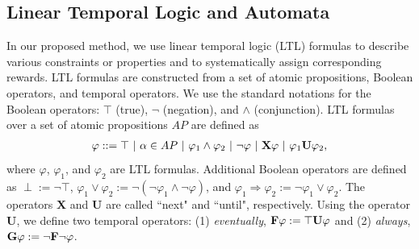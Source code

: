 \documentclass[letterpaper, 10 pt, conference]{ieeeconf}  %
\begin{document}
\subsection{Linear Temporal Logic and Automata}

In our proposed method, we use linear temporal logic (LTL) formulas to describe various constraints or properties and to systematically assign corresponding rewards.
LTL formulas are constructed from a set of atomic propositions, Boolean operators, and temporal operators. We use the standard notations for the Boolean operators: $\top$ (true), $\neg$ (negation), and $\land$ (conjunction).
LTL formulas over a set of atomic propositions $AP$ are defined as
\begin{align*}
  \varphi ::=\top\ |\ \alpha \in AP\ |\ \varphi_1 \land \varphi_2\ |\ \neg \varphi\ |\ \text{{\bf X}} \varphi\ |\ \varphi_1 \text{{\bf U}} \varphi_2,
\end{align*}
where $\varphi$, $\varphi_1$, and $\varphi_2$ are LTL formulas.
Additional Boolean operators are defined as $\perp := \neg \top $, $\varphi_1 \lor \varphi_2 := \neg(\neg \varphi_1 \land \neg \varphi)$, and $\varphi_1 \Rightarrow \varphi_2 := \neg \varphi_1 \lor \varphi_2$.
The operators {\bf X} and {\bf U} are called ``next" and ``until", respectively.
Using the operator {\bf U}, we define two temporal operators: (1) {\it eventually}, $\text{{\bf F}} \varphi := \top \text{{\bf U}} \varphi $ and (2) {\it always}, $\text{{\bf G}} \varphi := \neg \text{{\bf F}} \neg \varphi$.
\end{document}
